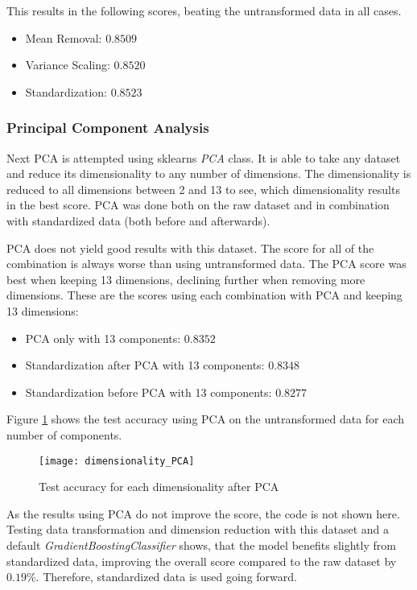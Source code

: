 This results in the following scores, beating the untransformed data in all cases.

\begin{itemize}
    \item Mean Removal: $0.8509$
    \item Variance Scaling: $0.8520$
    \item Standardization: $0.8523$
\end{itemize}

\subsubsection{Principal Component Analysis}

Next \ac{PCA} is attempted using sklearns \emph{PCA} class. It is able to take any dataset and reduce
its dimensionality to any number of dimensions. The dimensionality is reduced to all dimensions
between 2 and 13 to see, which dimensionality results in the best score.
\ac{PCA} was done both on the raw dataset and in combination with standardized data (both before and afterwards).

\ac{PCA} does not yield good results with this dataset. The score for all of the combination is always worse
than using untransformed data. 
The PCA score was best when keeping 13 dimensions, declining further when removing more dimensions.
These are the scores using each combination with PCA and keeping 13 dimensions:

\begin{itemize}
    \item PCA only with 13 components: $0.8352$
    \item Standardization after PCA with 13 components: $0.8348$
    \item Standardization before PCA with 13 components: $0.8277$
\end{itemize}

Figure \ref{fig:Score for each PCA dimensionality} shows the test accuracy using PCA on the untransformed data
for each number of components.

\begin{figure}[H]
    \caption{Test accuracy for each dimensionality after PCA}
	\label{fig:Score for each PCA dimensionality}
    \texttt{[image: dimensionality\_PCA]}
\end{figure}

As the results using \ac{PCA} do not improve the score, the code is not shown here.
Testing data transformation and dimension reduction with this dataset and a default \emph{GradientBoostingClassifier}
shows, that the model benefits slightly from standardized data, improving the overall score compared to the raw dataset
by $0.19\%$. Therefore, standardized data is used going forward.


